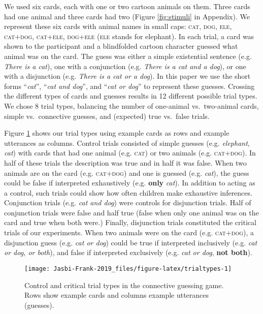\documentclass[,man,floatsintext]{apa6}
\begin{document}
We used six cards, each with one or two cartoon animals on them. Three cards had one animal and three cards had two (Figure \ref{fig:stimuli} in Appendix). We represent these six cards with animal names in small caps: \textsc{cat, dog, ele, cat+dog, cat+ele, dog+ele} (\textsc{ele} stands for elephant). In each trial, a card was shown to the participant and a blindfolded cartoon character guessed what animal was on the card. The guess was either a simple existential sentence (e.g. \emph{There is a cat}), one with a conjunction (e.g. \emph{There is a cat and a dog}), or one with a disjunction (e.g. \emph{There is a cat or a dog}). In this paper we use the short forms \enquote{\emph{cat}}, \enquote{\emph{cat and dog}}, and \enquote{\emph{cat or dog}} to represent these guesses. Crossing the different types of cards and guesses results in 12 different possible trial types. We chose 8 trial types, balancing the number of one-animal vs.~two-animal cards, simple vs.~connective guesses, and (expected) true vs.~false trials.

Figure \ref{fig:trialtypes} shows our trial types using example cards as rows and example utterances as columns. Control trials consisted of simple guesses (e.g. \emph{elephant}, \emph{cat}) with cards that had one animal (e.g. \textsc{cat}) or two animals (e.g. \textsc{cat+dog}). In half of these trials the description was true and in half it was false. When two animals are on the card (e.g. \textsc{cat+dog}) and one is guessed (e.g. \emph{cat}), the guess could be false if interpreted exhaustively (e.g. \textbf{only} \emph{cat}). In addition to acting as a control, such trials could show how often children make exhaustive inferences. Conjunction trials (e.g. \emph{cat and dog}) were controls for disjunction trials. Half of conjunction trials were false and half true (false when only one animal was on the card and true when both were.) Finally, disjunction trials constituted the critical trials of our experiments. When two animals were on the card (e.g. \textsc{cat+dog}), a disjunction guess (e.g. \emph{cat or dog}) could be true if interpreted inclusively (e.g. \emph{cat or dog, or both}), and false if interpreted exclusively (e.g. \emph{cat or dog}, \textbf{not both}).

\begin{figure}

{\centering \texttt{[image: Jasbi-Frank-2019\_files/figure-latex/trialtypes-1]} 

}

\caption{Control and critical trial types in the connective guessing game. Rows show example cards and columns example utterances (guesses).}\label{fig:trialtypes}
\end{figure}
\end{document}
